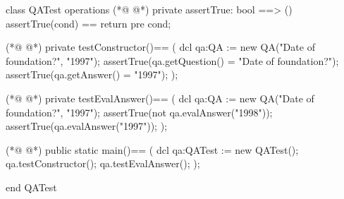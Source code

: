 \begin{vdmpp}[breaklines=true]
class QATest
    operations
(*@
\label{assertTrue:3}
@*)
        private assertTrue: bool ==> ()
    assertTrue(cond) == return
    pre cond;
    
(*@
\label{testConstructor:7}
@*)
        private testConstructor()==
        (
            dcl qa:QA := new QA("Date of foundation?", "1997");
            assertTrue(qa.getQuestion() = "Date of foundation?");
            assertTrue(qa.getAnswer() = "1997");
        );
    
(*@
\label{testEvalAnswer:14}
@*)
        private testEvalAnswer()==
        (
            dcl qa:QA := new QA("Date of foundation?", "1997");
            assertTrue(not qa.evalAnswer("1998"));
            assertTrue(qa.evalAnswer("1997"));
        );
        
(*@
\label{main:21}
@*)
        public static main()==
    (
            dcl qa:QATest := new QATest();
            qa.testConstructor();
            qa.testEvalAnswer();
    );

end QATest
\end{vdmpp}
